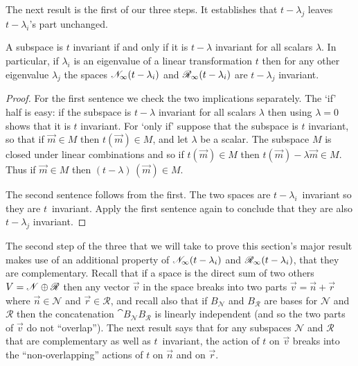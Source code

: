 The next result is the first of our three steps.
It establishes that \( t-\lambda_j \) leaves
\( t-\lambda_i \)'s part unchanged.

\begin{lemma} \label{le:tInvIfftMinLambdaInv}
A subspace is \( t \) invariant if and only if 
it is \( t-\lambda \) invariant for all scalars \( \lambda \).
In particular, 
if \( \lambda_i \) is an eigenvalue of  a linear transformation
\( t \) then for any other eigenvalue $\lambda_j$
the spaces \( \mathscr{N}_\infty(t-\lambda_i) \) 
and \( \mathscr{R}_\infty(t-\lambda_i) \)
are \( t-\lambda_j \) invariant.
\end{lemma}

\begin{proof}
For the first sentence we check the two implications separately.
The `if' half is easy: if the subspace is $t-\lambda$ invariant for 
all scalars $\lambda$ then using $\lambda=0$ shows that it is $t$ invariant.
For `only if' suppose that the subspace is $t$ invariant,
so that if $\vec{m}\in M$ then $t(\vec{m})\in M$, and let $\lambda$ be 
a scalar.
The subspace $M$ is closed under linear combinations and so if 
$t(\vec{m})\in M$ then $t(\vec{m})-\lambda\vec{m}\in M$.
Thus if $\vec{m}\in M$ then $(t-\lambda)\,(\vec{m})\in M$.

The second sentence follows from the first.
The
two spaces are $t-\lambda_i$~invariant so they are \( t \)~invariant.
Apply the first sentence again to
conclude that they are also \( t-\lambda_j \) invariant.
\end{proof}

The second step of the three that we will take to prove this
section's major result makes use of an additional property of 
\( \mathscr{N}_\infty(t-\lambda_i) \) and
\( \mathscr{R}_\infty(t-\lambda_i) \), that they are complementary.
Recall that if a space is the direct sum of two others 
\( V=\mathscr{N}\oplus \mathscr{R} \) 
then any vector \( \vec{v} \) in the space breaks into
two parts \( \vec{v}=\vec{n}+\vec{r} \) where \( \vec{n}\in \mathscr{N} \) and
\( \vec{r}\in \mathscr{R} \), and recall also 
that if \( B_{\mathscr{N}} \) and \( B_{\mathscr{R}} \) are bases for
\( \mathscr{N} \) and \( \mathscr{R} \) then the concatenation
\( \cat{B_{\mathscr{N}}}{B_{\mathscr{R}}} \) is linearly independent (and
so the two parts of \( \vec{v} \) do not ``overlap'').
The next result says that for any subspaces
\( \mathscr{N} \) and \( \mathscr{R} \) that are complementary 
as well as \( t \)~invariant,
the action
of \( t \) on \( \vec{v} \) breaks into the ``non-overlapping'' actions of
\( t \) on \( \vec{n} \) and on \( \vec{r} \).

